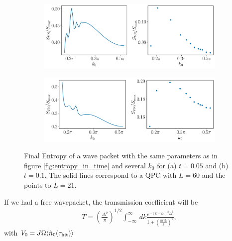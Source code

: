 \documentclass{article}
\begin{document}
\begin{figure}[h]
    \centering
    \begin{subfigure}[b]{0.7\textwidth}
        \includegraphics[width=\textwidth]{figures/report_08_2025/wavepacket_entropies_Lqpc=60_Omega=0.4_t=0.05.pdf}
        \caption{}
    \end{subfigure}
    \vspace{0.001\textwidth}
    \begin{subfigure}[b]{0.7\textwidth}
        \includegraphics[width=\textwidth]{figures/report_08_2025/wavepacket_entropies_Lqpc=60_Omega=0.4_t=0.1.pdf}
        \caption{}
    \end{subfigure}
    \caption{Final Entropy of a wave packet with the same parameters as in figure \ref{fig:entropy_in_time} and several $k_0$ for (a) $t=0.05$ and (b) $t=0.1$. The solid lines correspond to a QPC with $L=60$ and the points to $L=21$.}
    \label{fig:wave_packet_entropy}
\end{figure}

If we had a free wavepacket, the transmission coefficient will be
\begin{align}\label{eq:transmission_coef}
T = \left( \frac{\Delta^2}{\pi}\right)^{1/2} \int_{-\infty}^{\infty}  \, dk \frac{e^{-(k-k_{0})^2\Delta^2}}{1+\left(\frac{m V_{0}}{k}\right)^2 },
\end{align}
with $V_0 = J \Omega \langle \hat{n}_0(\tau_{\rm{hit}}) \rangle $
\end{document}
